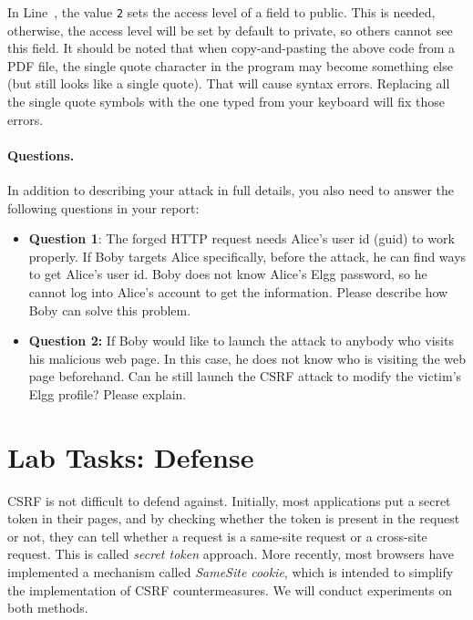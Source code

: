 In Line~, the value \texttt{2} sets the access level of a field to public. 
This is needed, otherwise, the access level will be set by default to private, so others cannot
see this field. It should be noted that when copy-and-pasting the above code
from a PDF file, the  single quote character in the program may become 
something else (but still looks like a single quote). That will cause 
syntax errors. Replacing all the single quote symbols with the one typed from 
your keyboard will fix those errors. 


\paragraph{Questions.}
In addition to describing your attack in full details, you also need to
answer the following questions in your report:

\begin{itemize}
   \item \textbf{Question 1}: The forged HTTP request needs Alice's user
   id (guid) to work properly. If Boby targets Alice specifically, before
   the attack, he can find ways to get Alice's user id. Boby does not know 
   Alice's Elgg password, so he cannot log into Alice's account to get
   the information. Please describe how Boby can solve this problem.

   
   \item \textbf{Question 2:} If Boby would like to launch the attack to
   anybody who visits his malicious web page. In this case, he does not
   know who is visiting the web page beforehand. Can he still launch the CSRF attack
   to modify the victim's Elgg profile? Please explain.
\end{itemize}





\section{Lab Tasks: Defense} 

CSRF is not difficult to defend against. Initially, most applications
put a secret token in their pages, and by checking whether the token
is present in the request or not, they can tell whether a request
is a same-site request or a cross-site request. This is called
\textit{secret token} approach. 
More recently,
most browsers have implemented a mechanism called 
\textit{SameSite cookie}, which is intended to simplify the 
implementation of CSRF countermeasures. We will 
conduct experiments on both methods. 


